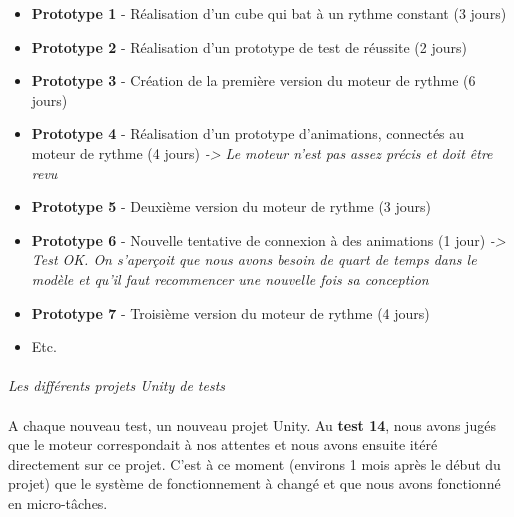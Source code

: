 \begin{itemize}
\item \textbf{Prototype 1} - Réalisation d’un cube qui bat à un rythme constant (3 jours)
\item \textbf{Prototype 2} - Réalisation d’un prototype de test de réussite (2 jours)
\item \textbf{Prototype 3} - Création de la première version du moteur de rythme (6 jours)
\item \textbf{Prototype 4} - Réalisation d’un prototype d’animations, connectés au moteur de rythme (4 jours) \emph{-> Le moteur n’est pas assez précis et doit être revu}
\item \textbf{Prototype 5} - Deuxième version du moteur de rythme (3 jours)
\item \textbf{Prototype 6} - Nouvelle tentative de connexion à des animations (1 jour) \emph{-> Test OK. On s’aperçoit que nous avons besoin de quart de temps dans le modèle et qu’il faut recommencer une nouvelle fois sa conception}
\item \textbf{Prototype 7} - Troisième version du moteur de rythme (4 jours)
\item Etc.
\end{itemize}

\paragraph{}
\noindent
{}
\begin{center}
\textit{Les différents projets Unity de tests
}
\end{center}

\paragraph{}
A chaque nouveau test, un nouveau projet Unity. Au \textbf{test 14}, nous avons jugés que le moteur correspondait à nos attentes et nous avons ensuite itéré directement sur ce projet. C’est à ce moment (environs 1 mois après le début du projet) que le système de fonctionnement à changé et que nous avons fonctionné en micro-tâches.

